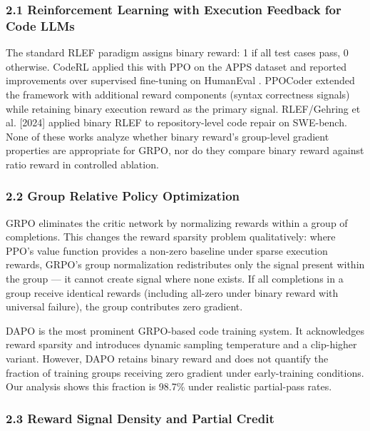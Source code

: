 
\subsubsection{2.1 Reinforcement Learning with Execution Feedback for Code LLMs}

The standard RLEF paradigm assigns binary reward: 1 if all test cases pass, 0 otherwise. CodeRL \citep{Le2022CodeRL} applied this with PPO on the APPS dataset \citep{Hendrycks2021APPS} and reported improvements over supervised fine-tuning on HumanEval \citep{Chen2021HumanEval}. PPOCoder \citep{Shojaee2023PPOCoder} extended the framework with additional reward components (syntax correctness signals) while retaining binary execution reward as the primary signal. RLEF/Gehring et al. [2024] applied binary RLEF to repository-level code repair on SWE-bench. None of these works analyze whether binary reward's group-level gradient properties are appropriate for GRPO, nor do they compare binary reward against ratio reward in controlled ablation.

\subsubsection{2.2 Group Relative Policy Optimization}

GRPO \citep{Shao2024DeepSeekMath} eliminates the critic network by normalizing rewards within a group of completions. This changes the reward sparsity problem qualitatively: where PPO's value function provides a non-zero baseline under sparse execution rewards, GRPO's group normalization redistributes only the signal present within the group --- it cannot create signal where none exists. If all completions in a group receive identical rewards (including all-zero under binary reward with universal failure), the group contributes zero gradient.

DAPO \citep{Yu2025DAPO} is the most prominent GRPO-based code training system. It acknowledges reward sparsity and introduces dynamic sampling temperature and a clip-higher variant. However, DAPO retains binary reward and does not quantify the fraction of training groups receiving zero gradient under early-training conditions. Our analysis shows this fraction is 98.7\% under realistic partial-pass rates.

\subsubsection{2.3 Reward Signal Density and Partial Credit}


